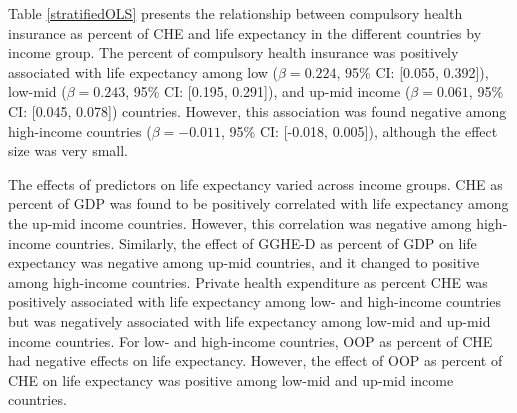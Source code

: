 \documentclass[]{elsarticle} %
\begin{document}
Table \ref{stratifiedOLS} presents the relationship between compulsory health insurance as percent of CHE and life expectancy in the different countries by income group. The percent of compulsory health insurance was positively associated with life expectancy among low (\(\beta = 0.224\), 95\% CI: {[}0.055, 0.392{]}), low-mid (\(\beta = 0.243\), 95\% CI: {[}0.195, 0.291{]}), and up-mid income (\(\beta = 0.061\), 95\% CI: {[}0.045, 0.078{]}) countries. However, this association was found negative among high-income countries (\(\beta = -0.011\), 95\% CI: {[}-0.018, 0.005{]}), although the effect size was very small.

The effects of predictors on life expectancy varied across income groups. CHE as percent of GDP was found to be positively correlated with life expectancy among the up-mid income countries. However, this correlation was negative among high-income countries. Similarly, the effect of GGHE-D as percent of GDP on life expectancy was negative among up-mid countries, and it changed to positive among high-income countries. Private health expenditure as percent CHE was positively associated with life expectancy among low- and high-income countries but was negatively associated with life expectancy among low-mid and up-mid income countries. For low- and high-income countries, OOP as percent of CHE had negative effects on life expectancy. However, the effect of OOP as percent of CHE on life expectancy was positive among low-mid and up-mid income countries.
\end{document}
